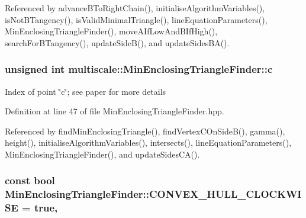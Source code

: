 Referenced by advance\-B\-To\-Right\-Chain(), initialise\-Algorithm\-Variables(), is\-Not\-B\-Tangency(), is\-Valid\-Minimal\-Triangle(), line\-Equation\-Parameters(), Min\-Enclosing\-Triangle\-Finder(), move\-A\-If\-Low\-And\-B\-If\-High(), search\-For\-B\-Tangency(), update\-Side\-B(), and update\-Sides\-B\-A().

\hypertarget{classmultiscale_1_1MinEnclosingTriangleFinder_a758f39b2d0cf35337f28d8ed871c2c0b}{
\subsubsection[{c}]{\setlength{\rightskip}{0pt plus 5cm}unsigned int multiscale\-::\-Min\-Enclosing\-Triangle\-Finder\-::c\hspace{0.3cm}{\ttfamily [private]}}}\label{classmultiscale_1_1MinEnclosingTriangleFinder_a758f39b2d0cf35337f28d8ed871c2c0b}
Index of point \char`\"{}c\char`\"{}; see paper for more details 

Definition at line 47 of file Min\-Enclosing\-Triangle\-Finder.\-hpp.



Referenced by find\-Min\-Enclosing\-Triangle(), find\-Vertex\-C\-On\-Side\-B(), gamma(), height(), initialise\-Algorithm\-Variables(), intersects(), line\-Equation\-Parameters(), Min\-Enclosing\-Triangle\-Finder(), and update\-Sides\-C\-A().

\hypertarget{classmultiscale_1_1MinEnclosingTriangleFinder_a951b35e4f359e61301deb0840abea51a}{
\subsubsection[{C\-O\-N\-V\-E\-X\-\_\-\-H\-U\-L\-L\-\_\-\-C\-L\-O\-C\-K\-W\-I\-S\-E}]{\setlength{\rightskip}{0pt plus 5cm}const bool Min\-Enclosing\-Triangle\-Finder\-::\-C\-O\-N\-V\-E\-X\-\_\-\-H\-U\-L\-L\-\_\-\-C\-L\-O\-C\-K\-W\-I\-S\-E = true\hspace{0.3cm}{\ttfamily [static]}, {\ttfamily [private]}}}\label{classmultiscale_1_1MinEnclosingTriangleFinder_a951b35e4f359e61301deb0840abea51a}



